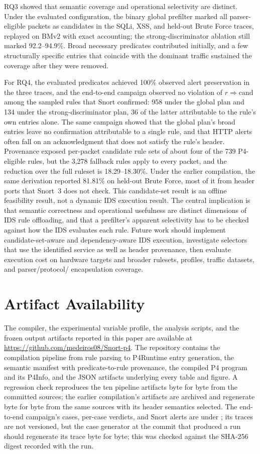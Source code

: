 \documentclass{article}
\begin{document}
RQ3 showed that semantic coverage and operational selectivity are distinct.
Under the evaluated configuration, the binary global prefilter marked all
parser-eligible packets as candidates in the SQLi, XSS, and held-out Brute
Force traces, replayed on BMv2 with exact accounting; the
strong-discriminator ablation still marked 92.2--94.9\%. Broad necessary
predicates contributed initially, and a few structurally specific entries
that coincide with the dominant traffic sustained the coverage after they
were removed.

For RQ4, the evaluated predicates achieved 100\% observed alert preservation
in the three traces, and the end-to-end campaign observed no violation of
$r \Rightarrow \mathrm{cand}$ among the sampled rules that Snort confirmed:
958 under the global plan and 134 under the strong-discriminator plan, 36 of
the latter attributable to the rule's own entries alone. The same campaign
showed that the global plan's broad entries leave no confirmation
attributable to a single rule, and that HTTP alerts often fall on an
acknowledgment that does not satisfy the rule's header. Provenance exposed
per-packet candidate rule sets of about four of the 739 P4-eligible rules,
but the 3,278 fallback rules apply to every packet, and the reduction over
the full ruleset is 18.29--18.30\%. Under the earlier compilation, the same
derivation reported 81.81\% on held-out Brute Force, most of it from header
ports that Snort~3 does not check. This candidate-set result is an offline
feasibility result, not a dynamic IDS execution result. The central
implication is that semantic correctness and operational usefulness are
distinct dimensions of IDS rule offloading, and that a prefilter's apparent
selectivity has to be checked against how the IDS evaluates each rule.
Future work should implement candidate-set-aware and dependency-aware IDS
execution, investigate selectors that use the identified service as well as
header provenance, then evaluate execution cost on hardware targets and
broader rulesets, profiles, traffic datasets, and parser/protocol/
encapsulation coverage.

\section*{Artifact Availability}
The compiler, the experimental variable profile, the analysis scripts, and the
frozen output artifacts reported in this paper are available at
\url{https://github.com/medeiros08/Snort-p4}. The repository contains the
compilation pipeline from rule parsing to P4Runtime entry generation, the
semantic manifest with predicate-to-rule provenance, the compiled P4 program
and its P4Info, and the JSON artifacts underlying every table and figure. A
regression check reproduces the ten pipeline artifacts byte for byte from the
committed sources; the earlier compilation's artifacts are archived and
regenerate byte for byte from the same sources with its header semantics
selected. The end-to-end campaign's cases, per-case verdicts, and Snort
alerts are under ; its traces are not versioned, but
the case generator at the commit that produced a run should regenerate its
trace byte for byte; this was checked against the SHA-256 digest recorded
with the run.
\end{document}

